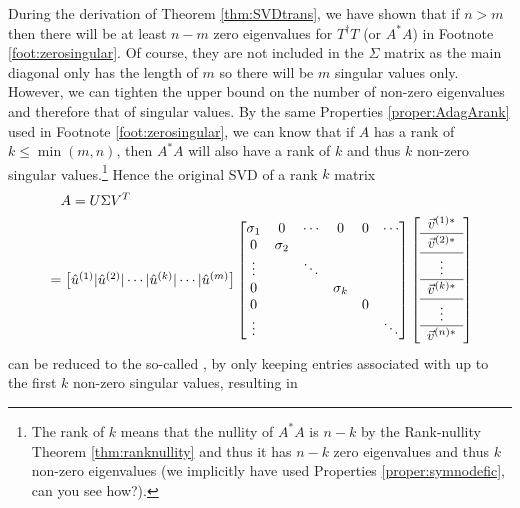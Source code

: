 During the derivation of Theorem \ref{thm:SVDtrans}, we have shown that if $n > m$ then there will be at least $n-m$ zero eigenvalues for $T^\dag T$ (or $A^*A$) in Footnote \ref{foot:zerosingular}. Of course, they are not included in the $\Sigma$ matrix as the main diagonal only has the length of $m$ so there will be $m$ singular values only. However, we can tighten the upper bound on the number of non-zero eigenvalues and therefore that of singular values. By the same Properties \ref{proper:AdagArank} used in Footnote \ref{foot:zerosingular}, we can know that if $A$ has a rank of $k \leq \min(m,n)$, then $A^*A$ will also have a rank of $k$ and thus $k$ non-zero singular values.\footnote{The rank of $k$ means that the nullity of $A^*A$ is $n-k$ by the Rank-nullity Theorem \ref{thm:ranknullity} and thus it has $n-k$ zero eigenvalues and thus $k$ non-zero eigenvalues (we implicitly have used Properties \ref{proper:symnodefic}, can you see how?).} Hence the original SVD of a rank $k$ matrix
\begin{align}
&\quad A = U\Sigma V^T \nonumber \\
&= \begin{bmatrix}
\hat{u}^{(1)} | \hat{u}^{(2)} | \cdots | \hat{u}^{(k)} | \cdots | \hat{u}^{(m)}
\end{bmatrix}
\begin{bmatrix}
\sigma_1 & 0 & \cdots & 0 & 0 & \cdots \\
0 & \sigma_2 & & \\
\vdots & & \ddots &\\
0 & & & \sigma_k & \\
0 & & & & 0 & \\
\vdots & & & & & \ddots
\end{bmatrix}
\left[\begin{array}{c} 
\vec{v}^{(1)*} \\
\hline
\vec{v}^{(2)*} \Tstrut \\
\hline
\vdots \\
\hline 
\vec{v}^{(k)*} \Tstrut \\
\hline
\vdots \\
\hline
\vec{v}^{(n)*} \Tstrut
\end{array}\right] 
\end{align}
can be reduced to the so-called , by only keeping entries associated with up to the first $k$ non-zero singular values, resulting in
